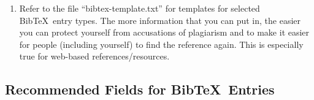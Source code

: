 \documentclass[letter,12pt]{article}
\begin{document}
\begin{enumerate}
\begin{enumerate}
	\item When {\sc Bib}\TeX\ entries are created for the aforementioned sources of information, populate the appropriate fields so that each information in the aforementioned sources are included in the {\sc Bib}\TeX\ entries.
	\end{enumerate}
\item Refer to the file ``bibtex-template.txt'' for templates for selected {\sc Bib}\TeX\ entry types. The more information that you can put in, the easier you can protect yourself from accusations of plagiarism and to make it easier for people (including yourself) to find the reference again. This is especially true for web-based references/resources.
\end{enumerate}



\subsection{Recommended Fields for {\sc Bib}\TeX\ Entries}
\label{ssec:RecommendedFieldsforBibTeXEntries}
\end{document}
